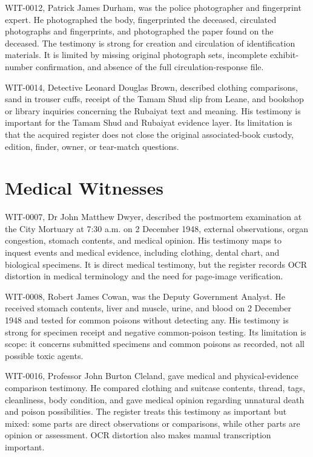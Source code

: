 WIT-0012, Patrick James Durham, was the police photographer and fingerprint expert. He photographed the body, fingerprinted the deceased, circulated photographs and fingerprints, and photographed the paper found on the deceased. The testimony is strong for creation and circulation of identification materials. It is limited by missing original photograph sets, incomplete exhibit-number confirmation, and absence of the full circulation-response file.

WIT-0014, Detective Leonard Douglas Brown, described clothing comparisons, sand in trouser cuffs, receipt of the Tamam Shud slip from Leane, and bookshop or library inquiries concerning the Rubaiyat text and meaning. His testimony is important for the Tamam Shud and Rubaiyat evidence layer. Its limitation is that the acquired register does not close the original associated-book custody, edition, finder, owner, or tear-match questions.

\section{Medical Witnesses}

WIT-0007, Dr John Matthew Dwyer, described the postmortem examination at the City Mortuary at 7:30 a.m. on 2 December 1948, external observations, organ congestion, stomach contents, and medical opinion. His testimony maps to inquest events and medical evidence, including clothing, dental chart, and biological specimens. It is direct medical testimony, but the register records OCR distortion in medical terminology and the need for page-image verification.

WIT-0008, Robert James Cowan, was the Deputy Government Analyst. He received stomach contents, liver and muscle, urine, and blood on 2 December 1948 and tested for common poisons without detecting any. His testimony is strong for specimen receipt and negative common-poison testing. Its limitation is scope: it concerns submitted specimens and common poisons as recorded, not all possible toxic agents.

WIT-0016, Professor John Burton Cleland, gave medical and physical-evidence comparison testimony. He compared clothing and suitcase contents, thread, tags, cleanliness, body condition, and gave medical opinion regarding unnatural death and poison possibilities. The register treats this testimony as important but mixed: some parts are direct observations or comparisons, while other parts are opinion or assessment. OCR distortion also makes manual transcription important.

